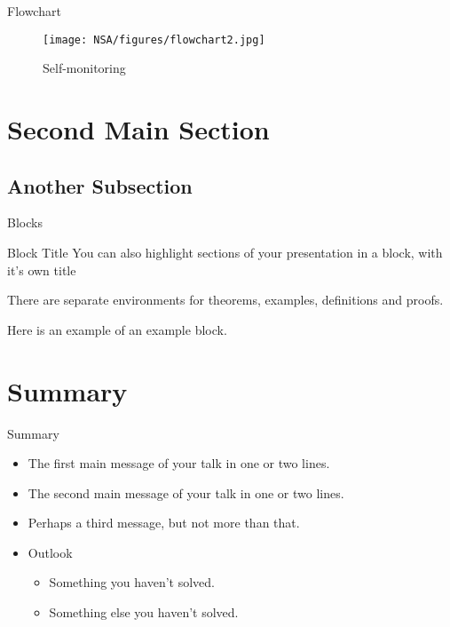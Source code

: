 \begin{frame}{Flowchart}
  \begin{figure}[hb]
  \centering
  \texttt{[image: NSA/figures/flowchart2.jpg]}
  \caption{Self-monitoring}
  \end{figure}
\end{frame}

\section{Second Main Section}

\subsection{Another Subsection}

\begin{frame}{Blocks}
\begin{block}{Block Title}
You can also highlight sections of your presentation in a block, with it's own title
\end{block}
\begin{theorem}
There are separate environments for theorems, examples, definitions and proofs.
\end{theorem}
\begin{example}
Here is an example of an example block.
\end{example}
\end{frame}

\section*{Summary}

\begin{frame}{Summary}
  \begin{itemize}
  \item
    The \alert{first main message} of your talk in one or two lines.
  \item
    The \alert{second main message} of your talk in one or two lines.
  \item
    Perhaps a \alert{third message}, but not more than that.
  \end{itemize}
  
  \begin{itemize}
  \item
    Outlook
    \begin{itemize}
    \item
      Something you haven't solved.
    \item
      Something else you haven't solved.
    \end{itemize}
  \end{itemize}
\end{frame}



